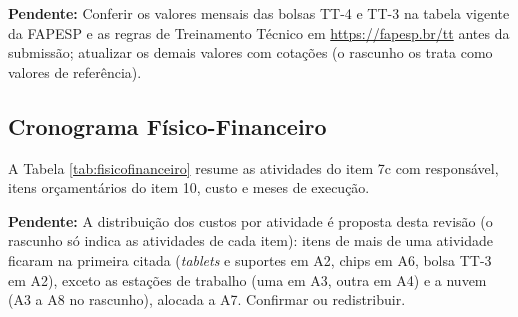 \documentclass[12pt,a4paper]{article}
\newcommand{\pendente}[1]{\begin{pendbox}\textbf{\color{pendfg}Pendente:} #1\end{pendbox}}
\begin{document}
\pendente{Conferir os valores mensais das bolsas TT-4 e TT-3 na tabela vigente da FAPESP e as regras de Treinamento Técnico em \url{https://fapesp.br/tt} antes da submissão; atualizar os demais valores com cotações (o rascunho os trata como valores de referência).}




\begin{landscape}
\section{Cronograma Físico-Financeiro}

A Tabela \ref{tab:fisicofinanceiro} resume as atividades do item 7c com responsável, itens orçamentários do item 10, custo e meses de execução.

\pendente{A distribuição dos custos por atividade é proposta desta revisão (o rascunho só indica as atividades de cada item): itens de mais de uma atividade ficaram na primeira citada (\textit{tablets} e suportes em A2, chips em A6, bolsa TT-3 em A2), exceto as estações de trabalho (uma em A3, outra em A4) e a nuvem (A3 a A8 no rascunho), alocada a A7. Confirmar ou redistribuir.}


\end{landscape}
\end{document}
